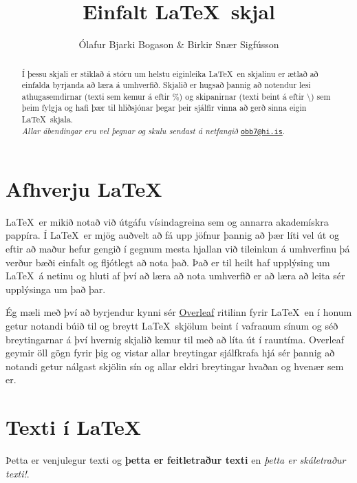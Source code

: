 \documentclass[a4paper]{article}
\title{Einfalt \LaTeX\ skjal}	%
\author{Ólafur Bjarki Bogason \& Birkir Snær Sigfússon}				%
\begin{document}
\maketitle

\begin{abstract}	%
	Í þessu skjali er stiklað á stóru um helstu eiginleika \LaTeX\ en skjalinu er ætlað að einfalda byrjanda að læra á umhverfið. Skjalið er hugsað þannig að notendur lesi athugasemdirnar (texti sem kemur á eftir \%) og skipanirnar (texti beint á eftir \textbackslash) sem þeim fylgja og hafi þær til hliðsjónar þegar þeir sjálfir vinna að gerð sinna eigin \LaTeX\ skjala. \\

\noindent \textit{Allar ábendingar eru vel þegnar og skulu sendast á netfangið } \href{mailto:obb7@hi.is}{\nolinkurl{obb7@hi.is}}. 
\end{abstract}

\tableofcontents

\listoffigures


\section{Afhverju \LaTeX}
\LaTeX\ er mikið notað við útgáfu vísindagreina sem og annarra akademískra pappíra. Í \LaTeX\ er mjög auðvelt að fá upp jöfnur þannig að þær líti vel út og eftir að maður hefur gengið í gegnum mesta hjallan við tileinkun á umhverfinu þá verður bæði einfalt og fljótlegt að nota það. Það er til heilt haf upplýsing um \LaTeX\ á netinu og hluti af því að læra að nota umhverfið er að læra að leita sér upplýsinga um það þar.

Ég mæli með því að byrjendur kynni sér \href{https://www.overleaf.com}{Overleaf} ritilinn fyrir \LaTeX\ en í honum getur notandi búið til og breytt \LaTeX\ skjölum beint í vafranum sínum og séð breytingarnar á því hvernig skjalið kemur til með að líta út í rauntíma. Overleaf geymir öll gögn fyrir þig og vistar allar breytingar sjálfkrafa hjá sér þannig að notandi getur nálgast skjölin sín og allar eldri breytingar hvaðan og hvenær sem er.

\section{Texti í \LaTeX}
Þetta er venjulegur texti og \textbf{þetta er feitletraður texti} en \textit{þetta er skáletraður texti!}.
\end{document}
